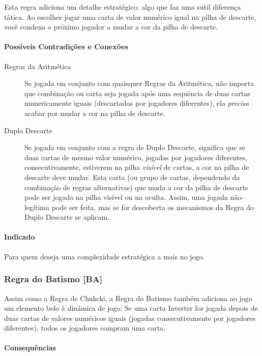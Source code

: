 Esta regra adiciona um detalhe estratégico: algo que faz uma sutil diferença tática. Ao escolher jogar uma carta de valor numérico igual na pilha de descarte, você condena o próximo jogador a mudar a cor da pilha de descarte. 

\paragraph{Possíveis Contradições e Conexões}

\begin{description}
\item[Regras da Aritmética]{Se jogada em conjunto com quaisquer Regras da Aritmética, não importa que combinação ou carta seja jogada após uma sequência de duas cartas numericamente iguais (descartadas por jogadores diferentes), ela \emph{precisa} acabar por mudar a cor na pilha de descarte.}
\item[Duplo Descarte]{Se jogada em conjunto com a regra de Duplo Descarte, significa que se duas cartas de mesmo valor numérico, jogadas por jogadores diferentes, consecutivamente, estiverem na pilha \emph{visível} de cartas, a cor na pilha de descarte deve mudar. Esta carta (ou grupo de cartas, dependendo da combinação de regras alternativas) que muda a cor da pilha de descarte pode ser jogada na pilha visível ou na oculta. Assim, uma jogada não-legítima pode ser feita, mas se for descoberta os mecanismos da Regra do Duplo Descarte se aplicam.}
\end{description}

\paragraph{Indicado} 

Para quem deseja uma complexidade estratégica a mais no jogo.

\subsubsection{Regra do Batismo [BA]}

Assim como a Regra de Chukcki, a Regra do Batismo também adiciona ao jogo um elemento belo à dinâmica de jogo: Se uma carta Inverter for jogada depois de duas cartas de valores numéricos iguais (jogadas consecutivamente por jogadores diferentes), todos os jogadores compram uma carta.

\paragraph{Consequências}

